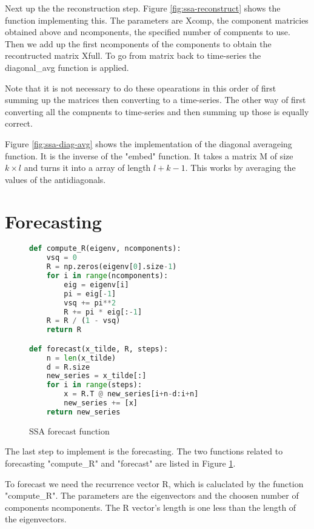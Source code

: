 Next up the the reconstruction step. Figure \ref{fig:ssa-reconstruct} shows the function implementing this. The parameters are Xcomp, the component matricies obtained above and ncomponents, the specified number of compnents to use. Then we add up the first ncomponents of the components to obtain the recontructed matrix Xfull. To go from matrix back to time-series the diagonal\_avg function is applied. 

Note that it is not necessary to do these opearations in this order of first summing up the matrices then converting to a time-series. The other way of first converting all the compnents to time-series and then summing up those is equally correct. 

Figure \ref{fig:ssa-diag-avg} shows the implementation of the diagonal averageing function. It is the inverse of the "embed" function. It takes a matrix M of size $k \times l$ and turns it into a array of length $l+k-1$. This works by averaging the values of the antidiagonals. 

\section{Forecasting}

\begin{figure}
\begin{singlespace}
\begin{lstlisting}[language=Python]
def compute_R(eigenv, ncomponents):
    vsq = 0
    R = np.zeros(eigenv[0].size-1)
    for i in range(ncomponents):
        eig = eigenv[i]
        pi = eig[-1]
        vsq += pi**2
        R += pi * eig[:-1]
    R = R / (1 - vsq)
    return R

def forecast(x_tilde, R, steps):
    n = len(x_tilde)
    d = R.size
    new_series = x_tilde[:]
    for i in range(steps):
        x = R.T @ new_series[i+n-d:i+n]
        new_series += [x]
    return new_series
\end{lstlisting}
\end{singlespace}
\caption{SSA forecast function}    
\label{fig:ssa-forecast}
\end{figure}

The last step to implement is the forecasting. The two functions related to forecasting "compute\_R" and "forecast" are listed in Figure \ref{fig:ssa-forecast}. 

To forecast we need the recurrence vector R, which is caluclated by the function "compute\_R". The parameters are the eigenvectors and the choosen number of components ncomponents. The R vector's length is one less than the length of the eigenvectors. 

